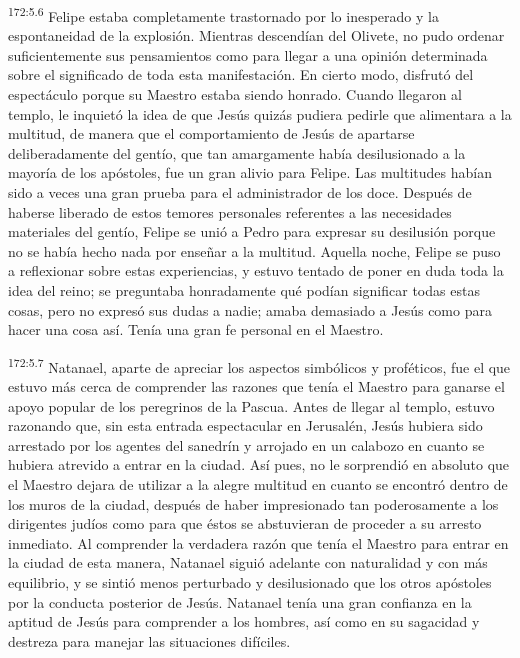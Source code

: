 \par 
\textsuperscript{172:5.6} Felipe estaba completamente trastornado por lo inesperado y la espontaneidad de la explosión. Mientras descendían del Olivete, no pudo ordenar suficientemente sus pensamientos como para llegar a una opinión determinada sobre el significado de toda esta manifestación. En cierto modo, disfrutó del espectáculo porque su Maestro estaba siendo honrado. Cuando llegaron al templo, le inquietó la idea de que Jesús quizás pudiera pedirle que alimentara a la multitud, de manera que el comportamiento de Jesús de apartarse deliberadamente del gentío, que tan amargamente había desilusionado a la mayoría de los apóstoles, fue un gran alivio para Felipe. Las multitudes habían sido a veces una gran prueba para el administrador de los doce. Después de haberse liberado de estos temores personales referentes a las necesidades materiales del gentío, Felipe se unió a Pedro para expresar su desilusión porque no se había hecho nada por enseñar a la multitud. Aquella noche, Felipe se puso a reflexionar sobre estas experiencias, y estuvo tentado de poner en duda toda la idea del reino; se preguntaba honradamente qué podían significar todas estas cosas, pero no expresó sus dudas a nadie; amaba demasiado a Jesús como para hacer una cosa así. Tenía una gran fe personal en el Maestro.

\par 
\textsuperscript{172:5.7} Natanael, aparte de apreciar los aspectos simbólicos y proféticos, fue el que estuvo más cerca de comprender las razones que tenía el Maestro para ganarse el apoyo popular de los peregrinos de la Pascua. Antes de llegar al templo, estuvo razonando que, sin esta entrada espectacular en Jerusalén, Jesús hubiera sido arrestado por los agentes del sanedrín y arrojado en un calabozo en cuanto se hubiera atrevido a entrar en la ciudad. Así pues, no le sorprendió en absoluto que el Maestro dejara de utilizar a la alegre multitud en cuanto se encontró dentro de los muros de la ciudad, después de haber impresionado tan poderosamente a los dirigentes judíos como para que éstos se abstuvieran de proceder a su arresto inmediato. Al comprender la verdadera razón que tenía el Maestro para entrar en la ciudad de esta manera, Natanael siguió adelante con naturalidad y con más equilibrio, y se sintió menos perturbado y desilusionado que los otros apóstoles por la conducta posterior de Jesús. Natanael tenía una gran confianza en la aptitud de Jesús para comprender a los hombres, así como en su sagacidad y destreza para manejar las situaciones difíciles.

